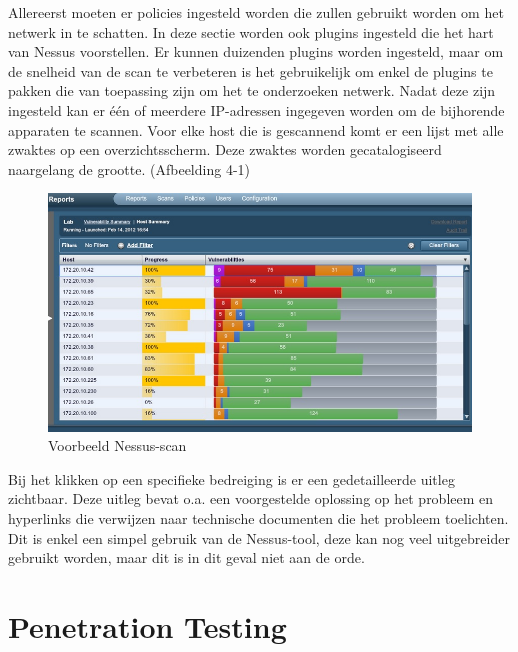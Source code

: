 \documentclass[pdftex,a4paper,12pt]{report}
\begin{document}
Allereerst moeten er policies ingesteld worden die zullen gebruikt worden om het netwerk in te schatten. In deze sectie worden ook plugins ingesteld die het hart van Nessus voorstellen. Er kunnen duizenden plugins worden ingesteld, maar om de snelheid van de scan te verbeteren is het gebruikelijk om enkel de plugins te pakken die van toepassing zijn om het te onderzoeken netwerk. Nadat deze zijn ingesteld kan er één of meerdere IP-adressen ingegeven worden om de bijhorende apparaten te scannen. Voor elke host die is gescannend komt er een lijst met alle zwaktes op een overzichtsscherm. Deze zwaktes worden gecatalogiseerd naargelang de grootte. (Afbeelding 4-1)

\begin{figure}[h!]
\begin{center}
\includegraphics[scale=0.60]{img/Nessus1}
\end{center}
\caption{Voorbeeld Nessus-scan}
\end{figure}

Bij het klikken op een specifieke bedreiging is er een gedetailleerde uitleg zichtbaar. Deze uitleg bevat o.a. een voorgestelde oplossing op het probleem en hyperlinks die verwijzen naar technische documenten die het probleem toelichten. Dit is enkel een simpel gebruik van de Nessus-tool, deze kan nog veel uitgebreider gebruikt worden, maar dit is in dit geval niet aan de orde. \citep{Jackson2010}

 


\chapter{Penetration Testing}
\end{document}
